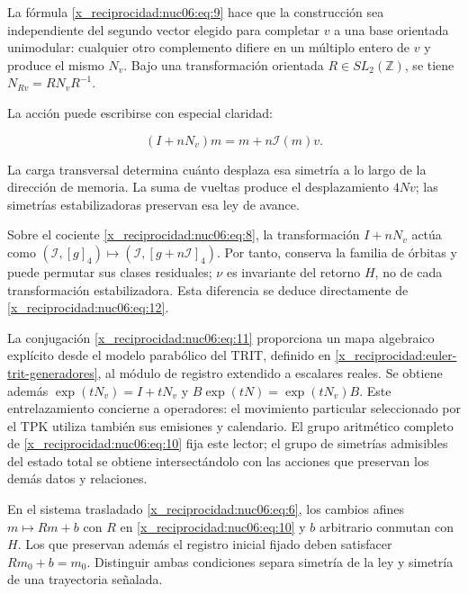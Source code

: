La fórmula \eqref{x_reciprocidad:nuc06:eq:9} hace que la construcción sea independiente del segundo vector elegido para completar \(v\) a una base orientada unimodular: cualquier otro complemento difiere en un múltiplo entero de \(v\) y produce el mismo \(N_v\). Bajo una transformación orientada \(R\in SL_2(\mathbb Z)\), se tiene \(N_{Rv}=RN_vR^{-1}\).

La acción puede escribirse con especial claridad:

\begin{equation}
(I+nN_v)m=m+n\mathcal I(m)v.
\label{x_reciprocidad:nuc06:eq:12}
\end{equation}

La carga transversal determina cuánto desplaza esa simetría a lo largo de la dirección de memoria. La suma de vueltas produce el desplazamiento \(4Nv\); las simetrías estabilizadoras preservan esa ley de avance.

Sobre el cociente \eqref{x_reciprocidad:nuc06:eq:8}, la transformación \(I+nN_v\) actúa como \((\mathcal I,[g]_4)\mapsto(\mathcal I,[g+n\mathcal I]_4)\). Por tanto, conserva la familia de órbitas y puede permutar sus clases residuales; \(\nu\) es invariante del retorno \(H\), no de cada transformación estabilizadora. Esta diferencia se deduce directamente de \eqref{x_reciprocidad:nuc06:eq:12}.

La conjugación \eqref{x_reciprocidad:nuc06:eq:11} proporciona un mapa algebraico explícito desde el modelo parabólico del TRIT, definido en \cref{x_reciprocidad:euler-trit-generadores}, al módulo de registro extendido a escalares reales. Se obtiene además \(\exp(tN_v)=I+tN_v\) y \(B\exp(tN)=\exp(tN_v)B\). Este entrelazamiento concierne a operadores: el movimiento particular seleccionado por el TPK utiliza también sus emisiones y calendario. El grupo aritmético completo de \eqref{x_reciprocidad:nuc06:eq:10} fija este lector; el grupo de simetrías admisibles del estado total se obtiene intersectándolo con las acciones que preservan los demás datos y relaciones.

En el sistema trasladado \eqref{x_reciprocidad:nuc06:eq:6}, los cambios afines \(m\mapsto Rm+b\) con \(R\) en \eqref{x_reciprocidad:nuc06:eq:10} y \(b\) arbitrario conmutan con \(H\). Los que preservan además el registro inicial fijado deben satisfacer \(Rm_0+b=m_0\). Distinguir ambas condiciones separa simetría de la ley y simetría de una trayectoria señalada.

